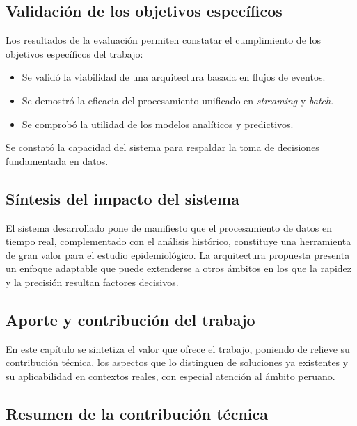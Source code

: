 \documentclass[12pt,a4paper]{article}
\providecommand{\tightlist}{%
  \setlength{\itemsep}{0pt}\setlength{\parskip}{0pt}}
\begin{document}
\subsection{Validación de los objetivos específicos}\label{validaciuxf3n-de-los-objetivos-especuxedficos}

Los resultados de la evaluación permiten constatar el cumplimiento de los objetivos específicos del trabajo:

\begin{itemize}
    \tightlist
    \item
          Se validó la viabilidad de una arquitectura basada en flujos de eventos.
    \item
          Se demostró la eficacia del procesamiento unificado en \emph{streaming} y \emph{batch}.
    \item
          Se comprobó la utilidad de los modelos analíticos y predictivos.
\end{itemize}

Se constató la capacidad del sistema para respaldar la toma de decisiones fundamentada en datos.

\subsection{Síntesis del impacto del sistema}\label{suxedntesis-del-impacto-del-sistema}

El sistema desarrollado pone de manifiesto que el procesamiento de datos en tiempo real, complementado con el análisis histórico, constituye una herramienta de gran valor para el estudio epidemiológico. La arquitectura propuesta presenta un enfoque adaptable que puede extenderse a otros ámbitos en los que la rapidez y la precisión resultan factores decisivos.


\subsection{Aporte y contribución del trabajo}\label{aporte-y-contribuciuxf3n-del-trabajo}

En este capítulo se sintetiza el valor que ofrece el trabajo, poniendo de relieve su contribución técnica, los aspectos que lo distinguen de soluciones ya existentes y su aplicabilidad en contextos reales, con especial atención al ámbito peruano.

\subsection{Resumen de la contribución técnica}\label{resumen-de-la-contribuciuxf3n-tuxe9cnica}
\end{document}

